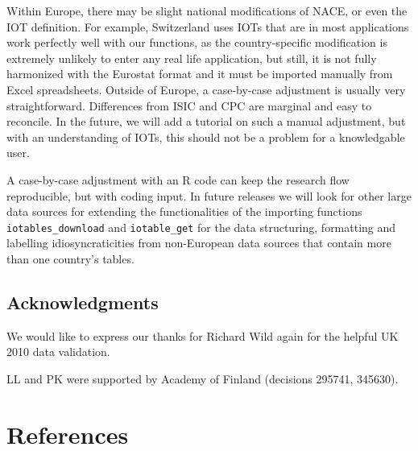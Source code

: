\documentclass[
]{article}
\begin{document}
Within Europe, there may be slight national modifications of NACE, or
even the IOT definition. For example, Switzerland uses IOTs that are in
most applications work perfectly well with our functions, as the
country-specific modification is extremely unlikely to enter any real
life application, but still, it is not fully harmonized with the
Eurostat format and it must be imported manually from Excel
spreadsheets. Outside of Europe, a case-by-case adjustment is usually
very straightforward. Differences from ISIC and CPC are marginal and
easy to reconcile. In the future, we will add a tutorial on such a
manual adjustment, but with an understanding of IOTs, this should not be
a problem for a knowledgable user.

A case-by-case adjustment with an R code can keep the research flow
reproducible, but with coding input. In future releases we will look for
other large data sources for extending the functionalities of the
importing functions \texttt{iotables\_download} and
\texttt{iotable\_get} for the data structuring, formatting and labelling
idiosyncraticities from non-European data sources that contain more than
one country's tables.

\hypertarget{acknowledgments}{%
\subsection{Acknowledgments}\label{acknowledgments}}

We would like to express our thanks for Richard Wild again for the
helpful UK 2010 data validation.

LL and PK were supported by Academy of Finland (decisions 295741,
345630).

\hypertarget{references}{%
\section*{References}\label{references}}
\end{document}
